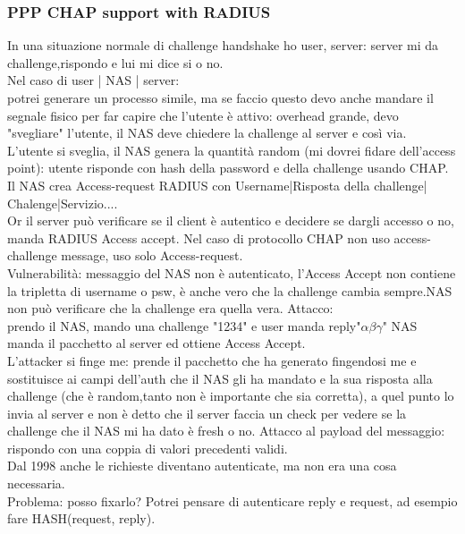 \documentclass[16px]{article}
\begin{document}
\subsubsection{PPP CHAP support with RADIUS}
In una situazione normale di challenge handshake ho user, server: server mi da challenge,rispondo e lui mi dice si o no.\\ Nel caso di user | NAS | server:\\
potrei generare un processo simile, ma se faccio questo devo anche mandare il segnale fisico per far capire che l'utente è attivo: overhead grande, devo "svegliare" l'utente, il NAS deve chiedere la challenge al server e così via.\\ L'utente si sveglia, il NAS genera la quantità random (mi dovrei fidare dell'access point): utente risponde con hash della password e della challenge usando CHAP. Il NAS crea Access-request RADIUS con Username|Risposta della challenge| Chalenge|Servizio....\\ Or il server può verificare se il client è autentico e decidere se dargli accesso o no, manda RADIUS Access accept. Nel caso di protocollo CHAP non uso access-challenge message, uso solo Access-request.\\ Vulnerabilità: messaggio del NAS non è autenticato, l'Access Accept non contiene la tripletta di username o psw, è anche vero che la challenge cambia sempre.NAS non può verificare che la challenge era quella vera. Attacco:\\ prendo il NAS, mando una challenge "1234" e user manda reply"$\alpha\beta\gamma$" NAS manda il pacchetto al server ed ottiene Access Accept.\\L'attacker si finge me: prende il pacchetto che ha generato fingendosi me e sostituisce ai campi dell'auth che il NAS gli ha mandato e la sua risposta alla challenge (che è random,tanto non è importante che sia corretta), a quel punto lo invia al server e non è detto che il server faccia un check per vedere se la challenge che il NAS mi ha dato è fresh o no. Attacco al payload del messaggio: rispondo con una coppia di valori precedenti validi. \\ Dal 1998 anche le richieste diventano autenticate, ma non era una cosa necessaria.\\ Problema: posso fixarlo? Potrei pensare di autenticare reply e request, ad esempio fare HASH(request, reply).
\end{document}
